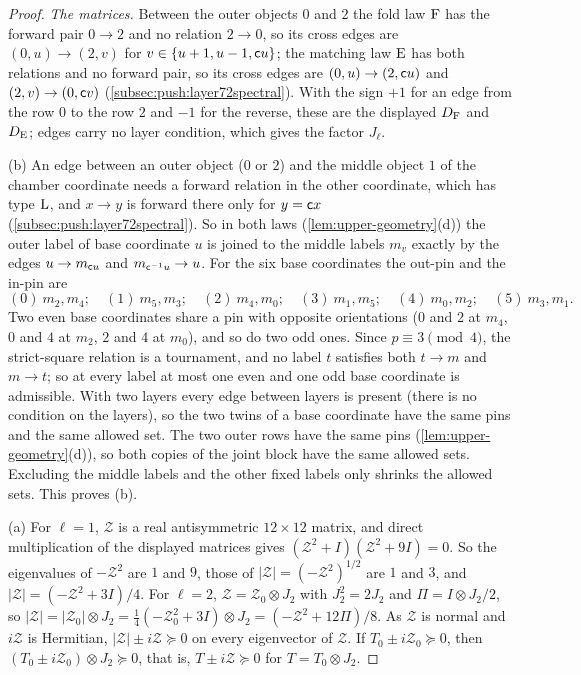 \begin{proof}
\emph{The matrices.} Between the outer objects $0$ and $2$ the fold law $\rm F$ has the
forward pair $0\to2$ and no relation $2\to0$, so its cross edges are $(0,u)\to(2,v)$
for $v\in\{u+1,u-1,\mathsf c u\}$; the matching law $\rm E$ has both relations and no
forward pair, so its cross edges are $(0,u)\to(2,\mathsf c u)$ and $(2,v)\to(0,\mathsf c v)$
(\cref{subsec:push:layer72spectral}). With the sign $+1$ for an edge from the row $0$
to the row $2$ and $-1$ for the reverse, these are the displayed $D_{\rm F}$ and
$D_{\rm E}$; edges carry no layer condition, which gives the factor $J_\ell$.

(b) An edge between an outer object ($0$ or $2$) and the middle object $1$ of the
chamber coordinate needs a forward relation in the other coordinate, which has type
$\rm L$, and $x\to y$ is forward there only for $y=\mathsf c x$
(\cref{subsec:push:layer72spectral}). So in both laws (\cref{lem:upper-geometry}(d))
the outer label of base coordinate $u$ is joined to the middle labels $m_v$ exactly by
the edges $u\to m_{\mathsf c u}$ and $m_{\mathsf c^{-1}u}\to u$. For the six base coordinates
the out-pin and the in-pin are
\[
 (0)\ m_2,m_4;\quad(1)\ m_5,m_3;\quad(2)\ m_4,m_0;\quad
 (3)\ m_1,m_5;\quad(4)\ m_0,m_2;\quad(5)\ m_3,m_1 .
\]
Two even base coordinates share a pin with opposite orientations ($0$ and $2$ at
$m_4$, $0$ and $4$ at $m_2$, $2$ and $4$ at $m_0$), and so do two odd ones. Since
$p\equiv3\pmod4$, the strict-square relation is a tournament, and no label $t$
satisfies both $t\to m$ and $m\to t$; so at every label at most one even and one odd
base coordinate is admissible. With two layers every edge between layers is present
(there is no condition on the layers), so the two twins of a base coordinate have the
same pins and the same allowed set. The two outer rows have the same pins
(\cref{lem:upper-geometry}(d)), so both copies of the joint block have the same
allowed sets. Excluding the middle labels and the other fixed labels only shrinks the
allowed sets. This proves (b).

(a) For $\ell=1$, $\mathcal Z$ is a real antisymmetric $12\times12$ matrix, and direct
multiplication of the displayed matrices gives $(\mathcal Z^2+I)(\mathcal Z^2+9I)=0$.
So the eigenvalues of $-\mathcal Z^2$ are $1$ and $9$, those of
$|\mathcal Z|=(-\mathcal Z^2)^{1/2}$ are $1$ and $3$, and $|\mathcal Z|=(-\mathcal Z^2+3I)/4$.
For $\ell=2$, $\mathcal Z=\mathcal Z_0\otimes J_2$ with $J_2^2=2J_2$ and $\Pi=I\otimes J_2/2$,
so $|\mathcal Z|=|\mathcal Z_0|\otimes J_2=\frac14(-\mathcal Z_0^2+3I)\otimes J_2
=(-\mathcal Z^2+12\Pi)/8$. As $\mathcal Z$ is normal and $i\mathcal Z$ is Hermitian,
$|\mathcal Z|\pm i\mathcal Z\succeq0$ on every eigenvector of $\mathcal Z$. If
$T_0\pm i\mathcal Z_0\succeq0$, then $(T_0\pm i\mathcal Z_0)\otimes J_2\succeq0$, that is,
$T\pm i\mathcal Z\succeq0$ for $T=T_0\otimes J_2$.


\end{proof}
